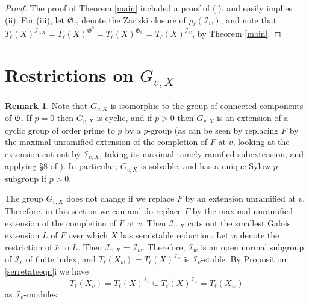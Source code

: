 \documentclass{amsart}
\def\I{{\mathcal I}}
\def\II{{{\mathcal I}_{v,X}}}
\def\r{{\mathfrak G}}
\theoremstyle{definition}
\newtheorem{rem}[thm]{Remark}
\begin{document}
\begin{proof}
The proof of Theorem \ref{main} included a proof of (i), and
easily implies (ii). For (iii), let 
$\r_{w}$ denote
the Zariski closure of $\rho_{\ell}(\I_{w})$, and
note that 
$T_{\ell}(X)^{\II} = T_{\ell}(X)^{\r^{0}} = 
T_{\ell}(X)^{\r_{w}} = T_{\ell}(X)^{\I_{w}}$,
by Theorem \ref{main}.
\end{proof}

\section{Restrictions on $G_{v,X}$}
\label{bounds}

\begin{rem}
\label{cyclicrem}
Note that 
$G_{v,X}$ is isomorphic to the group of connected components of $\r$.
If $p=0$ then $G_{v,X}$ is cyclic, and if
$p>0$ then $G_{v,X}$ is an extension of a cyclic group of order
prime to $p$ by a $p$-group 
(as can be seen by replacing $F$ by the maximal unramified
extension of the completion of $F$ at $v$, looking at the
extension cut out by $\II$, taking its maximal tamely ramified
subextension, and applying \S8 of \cite{Frohlich}).
In particular, $G_{v,X}$ is solvable, and has a unique 
Sylow-$p$-subgroup if $p>0$. 
\end{rem}

The group $G_{v,X}$ does not change if we replace $F$ by an
extension unramified at $v$. Therefore, in this section we
can and do replace $F$ by the maximal unramified
extension of the completion of $F$ at $v$. Then $\II$ cuts out
the smallest Galois extension $L$ of $F$ over which $X$ has
semistable reduction. Let $w$ denote the restriction of ${\bar v}$
to $L$. 
Then $\II = \I_{w}$. 
Therefore, $\I_w$ is an open normal subgroup of $\I_v$ of finite index, %
and  
$T_\ell(X_w)=T_\ell(X)^{\I_w}$ is $\I_v$-stable. 
By Proposition \ref{serretateeqn}i we have 
$$T_{\ell}(X_{v}) = T_{\ell}(X)^{\I_{v}} \subseteq 
T_{\ell}(X)^{\I_{w}} = T_{\ell}(X_{w})$$
as $\I_v$-modules.
\end{document}

